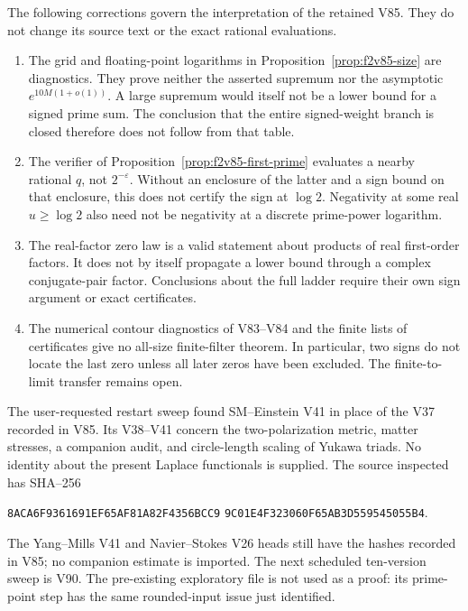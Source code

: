\documentclass[11pt]{article}
\theoremstyle{definition}
\theoremstyle{remark}
\begin{document}
The following corrections govern the interpretation of the retained V85.
They do not change its source text or the exact rational evaluations.
\begin{enumerate}
\item The grid and floating-point logarithms in
Proposition~\ref{prop:f2v85-size} are diagnostics.  They prove neither
the asserted supremum nor the asymptotic
\(e^{10M(1+o(1))}\).  A large supremum would itself not be a lower
bound for a signed prime sum.  The conclusion that the entire signed-weight
branch is closed therefore does not follow from that table.
\item The verifier of Proposition~\ref{prop:f2v85-first-prime} evaluates
a nearby rational \(q\), not \(2^{-\varepsilon}\).  Without an
enclosure of the latter and a sign bound on that enclosure, this does not
certify the sign at \(\log2\).  Negativity at some real \(u\ge\log2\)
also need not be negativity at a discrete prime-power logarithm.
\item The real-factor zero law is a valid statement about products of
real first-order factors.  It does not by itself propagate a lower bound
through a complex conjugate-pair factor.  Conclusions about the full
ladder require their own sign argument or exact certificates.
\item The numerical contour diagnostics of V83--V84 and the finite
lists of certificates give no all-size finite-filter theorem.  In
particular, two signs do not locate the last zero unless all later zeros
have been excluded.  The finite-to-limit transfer remains open.
\end{enumerate}

The user-requested restart sweep found SM--Einstein V41 in place of the
V37 recorded in V85.  Its V38--V41 concern the two-polarization metric,
matter stresses, a companion audit, and circle-length scaling of Yukawa
triads.  No identity about the present Laplace functionals is supplied.
The source inspected has SHA--256
\begin{center}
\texttt{8ACA6F9361691EF65AF81A82F4356BCC9}\allowbreak
\texttt{9C01E4F323060F65AB3D559545055B4}.
\end{center}
The Yang--Mills V41 and Navier--Stokes V26 heads still have the hashes
recorded in V85; no companion estimate is imported.  The next scheduled
ten-version sweep is V90.  The pre-existing exploratory file
 is not used as a proof:
its prime-point step has the same rounded-input issue just identified.
\end{document}
